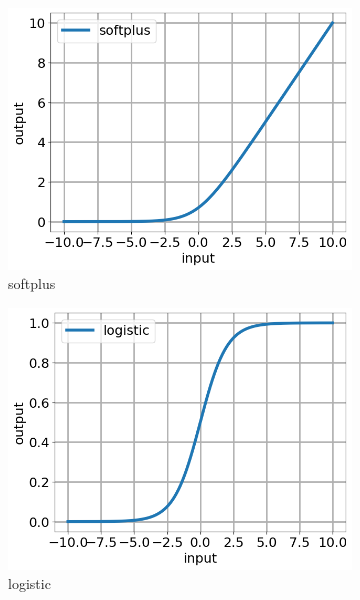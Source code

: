 \documentclass[12pt]{article}
\begin{document}
%
\begin{figure}[h]
  \centering
  \begin{subfigure}[c]{5.5cm}
    \includegraphics[totalheight=4cm]{Figures/scripts/softplus.png}
    \caption{softplus}
  \end{subfigure}
  \begin{subfigure}[c]{5.5cm}
    \includegraphics[totalheight=4cm]{Figures/scripts/logistic.png}
    \caption{logistic}
  \end{subfigure}\\
  \begin{subfigure}[c]{5.5cm}

\end{subfigure}
\end{figure}
\end{document}
